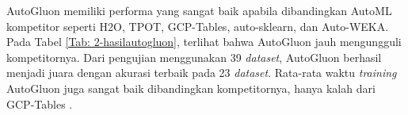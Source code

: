 AutoGluon memiliki performa yang sangat baik apabila dibandingkan AutoML kompetitor seperti H2O, TPOT, GCP-Tables, auto-sklearn, dan Auto-WEKA. Pada Tabel
\ref{Tab: 2-hasilautogluon}, terlihat bahwa AutoGluon jauh mengungguli kompetitornya. Dari pengujian menggunakan 39 \emph{dataset}, AutoGluon berhasil menjadi
juara dengan akurasi terbaik pada 23 \emph{dataset}. Rata-rata waktu \emph{training} AutoGluon juga sangat baik dibandingkan kompetitornya, hanya kalah dari
GCP-Tables \cite{agtabular}.

\begin{table}[!ht]
	\centering
	\caption[Perbandingan performa AutoGluon dengan AutoML kompetitor]{Perbandingan performa AutoGluon dengan AutoML kompetitor \cite{agtabular}}
	\vspace{0.5em}
	\label{Tab: 2-hasilautogluon}
\end{table}